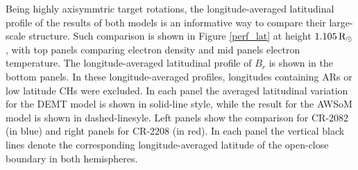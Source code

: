 \documentclass[namedreferences]{solarphysics}
\newcommand{\mrsun}{{\rm R_\odot}}
\begin{document}
\begin{article}
{Being highly axisymmtric target rotations, the longitude-averaged latitudinal {profile} of the results of both models is an informative way to compare their large-scale structure. Such comparison is shown in Figure \ref{perf_lat} at height $1.105\,\mrsun$, with top panels comparing electron density and mid panels electron temperature. {The longitude-averaged latitudinal profile of $B_r$ is shown in the bottom panels.} In these longitude-averaged profiles, longitudes containing ARs or low latitude CHs were excluded. In each panel the averaged latitudinal variation for the DEMT model is shown in solid-line style, while the result for the AWSoM model is shown in dashed-linesyle. Left panels show the comparison for CR-2082 (in blue) and right panels for CR-2208 (in red). In each panel the vertical black lines denote the corresponding longitude-averaged latitude of the open-close boundary in both hemispheres.}


\end{article}
\end{document}
